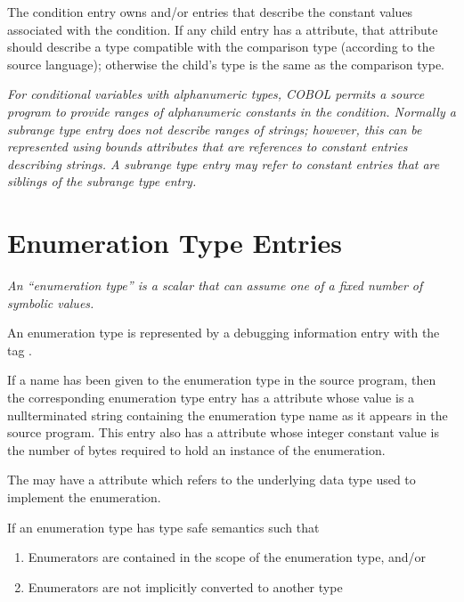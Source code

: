 The condition entry owns  and/or
 entries that describe the constant
values associated with the condition. If any child entry 
has
a  attribute,
that attribute should describe a type
compatible with the comparison type (according to the source
language); otherwise the child’s type is the same as the
comparison type.

\textit{For conditional variables with alphanumeric types, COBOL
permits a source program to provide ranges of alphanumeric
constants in the condition. Normally a subrange type entry
does not describe ranges of strings; however, this can be
represented using bounds attributes that are references to
constant entries describing strings. A subrange type entry may
refer to constant entries that are siblings of the subrange
type entry.}


\section{Enumeration Type Entries}
\label{chap:enumerationtypeentries}

\textit{An “enumeration type” is a scalar that can assume one of
a fixed number of symbolic values.}

An enumeration type is represented by a debugging information
entry with the tag 
.

If a name has been given to the enumeration type in the source
program, then the corresponding enumeration type entry has
a  attribute
whose value is a null\dash terminated
string containing the enumeration type name as it appears
in the source program. This entry also has a 
attribute whose integer constant value is the number of bytes
required to hold an instance of the enumeration.

The 
may have 
a  attribute
which refers to the underlying data type used to implement
the enumeration.

If an enumeration type has type safe 
semantics such that

\begin{enumerate}[1.]
\item Enumerators are contained in the scope of the enumeration type, and/or

\item Enumerators are not implicitly converted to another type
\end{enumerate}

